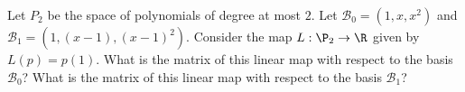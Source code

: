 \begin{problem}
	Let $P_2$ be the space of polynomials of degree at most $2$.  Let $\mathcal{B}_0 = (1,x,x^2)$ and $\mathcal{B}_1 = (1,(x-1),(x-1)^2)$.  
	Consider the map $L:\P_2 \to \R$ given by $L(p) = p(1)$.  What is the matrix of this linear map with respect to the basis $\mathcal{B}_0$?  
	What is the matrix of this linear map with respect to the basis $\mathcal{B}_1$?  
\end{problem}



